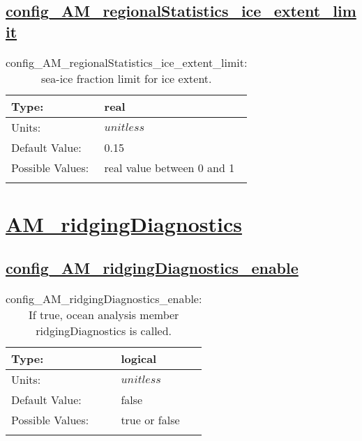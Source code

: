\subsection[config\_AM\_regionalStatistics\_ice\_extent\_limit]{\hyperref[sec:nm_tab_AM_regionalStatistics]{config\_AM\_regionalStatistics\_ice\_extent\_limit}}
\label{subsec:nm_sec_config_AM_regionalStatistics_ice_extent_limit}
\begin{center}
\begin{longtable}{| p{2.0in} || p{4.0in} |}
    \hline
    Type: & real \\
    \hline
    Units: & $unitless$ \\
    \hline
    Default Value: & 0.15 \\
    \hline
    Possible Values: & real value between 0 and 1 \\
    \hline
    \caption{config\_AM\_regionalStatistics\_ice\_extent\_limit: sea-ice fraction limit for ice extent.}
\end{longtable}
\end{center}
\section[AM\_ridgingDiagnostics]{\hyperref[sec:nm_tab_AM_ridgingDiagnostics]{AM\_ridgingDiagnostics}}
\label{sec:nm_sec_AM_ridgingDiagnostics}
\subsection[config\_AM\_ridgingDiagnostics\_enable]{\hyperref[sec:nm_tab_AM_ridgingDiagnostics]{config\_AM\_ridgingDiagnostics\_enable}}
\label{subsec:nm_sec_config_AM_ridgingDiagnostics_enable}
\begin{center}
\begin{longtable}{| p{2.0in} || p{4.0in} |}
    \hline
    Type: & logical \\
    \hline
    Units: & $unitless$ \\
    \hline
    Default Value: & false \\
    \hline
    Possible Values: & true or false \\
    \hline
    \caption{config\_AM\_ridgingDiagnostics\_enable: If true, ocean analysis member ridgingDiagnostics is called.}
\end{longtable}
\end{center}
